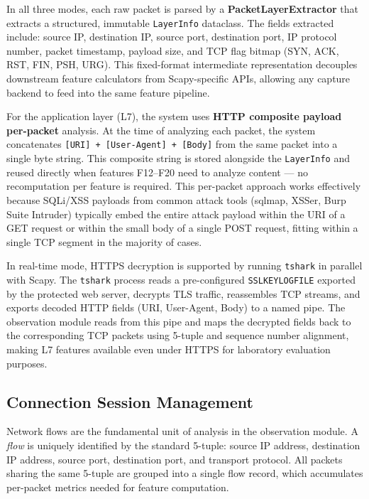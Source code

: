 \documentclass[12pt,a4paper]{report}
\begin{document}
In all three modes, each raw packet is parsed by a \textbf{PacketLayerExtractor} that extracts a structured, immutable \texttt{LayerInfo} dataclass. The fields extracted include: source IP, destination IP, source port, destination port, IP protocol number, packet timestamp, payload size, and TCP flag bitmap (SYN, ACK, RST, FIN, PSH, URG). This fixed-format intermediate representation decouples downstream feature calculators from Scapy-specific APIs, allowing any capture backend to feed into the same feature pipeline.

For the application layer (L7), the system uses \textbf{HTTP composite payload per-packet} analysis. At the time of analyzing each packet, the system concatenates \texttt{[URI] + [User-Agent] + [Body]} from the same packet into a single byte string. This composite string is stored alongside the \texttt{LayerInfo} and reused directly when features F12--F20 need to analyze content --- no recomputation per feature is required. This per-packet approach works effectively because SQLi/XSS payloads from common attack tools (sqlmap, XSSer, Burp Suite Intruder) typically embed the entire attack payload within the URI of a GET request or within the small body of a single POST request, fitting within a single TCP segment in the majority of cases.

In real-time mode, HTTPS decryption is supported by running \texttt{tshark} in parallel with Scapy. The \texttt{tshark} process reads a pre-configured \texttt{SSLKEYLOGFILE} exported by the protected web server, decrypts TLS traffic, reassembles TCP streams, and exports decoded HTTP fields (URI, User-Agent, Body) to a named pipe. The observation module reads from this pipe and maps the decrypted fields back to the corresponding TCP packets using 5-tuple and sequence number alignment, making L7 features available even under HTTPS for laboratory evaluation purposes.

\subsection{Connection Session Management}

Network flows are the fundamental unit of analysis in the observation module. A \textit{flow} is uniquely identified by the standard 5-tuple: source IP address, destination IP address, source port, destination port, and transport protocol. All packets sharing the same 5-tuple are grouped into a single flow record, which accumulates per-packet metrics needed for feature computation.
\end{document}
